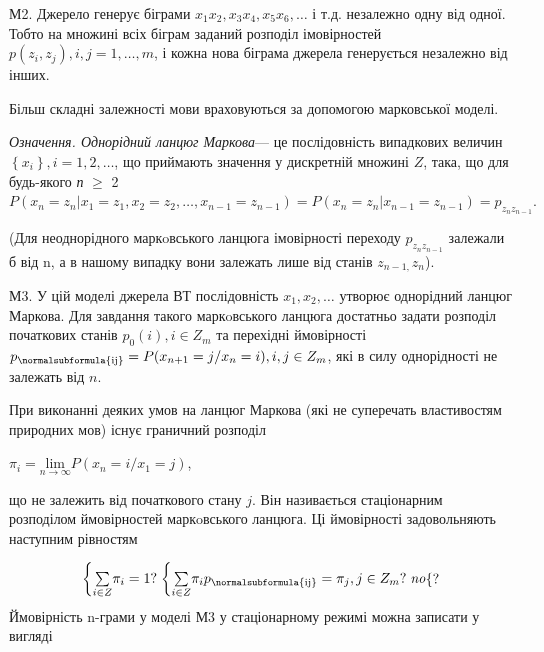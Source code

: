 М2. Джерело генерує біграми 
${x_{{1}}x_{{2}},x_{{3}}x_{{4}},x_{{5}}x_{{6}},\dots}$ і
т.д. незалежно одну від одної. Тобто на множині всіх біграм заданий розподіл
імовірностей  ${p(z_{{i}},z_{{j}}),i,j=1,\dots,m}$, і кожна
нова біграма джерела генерується незалежно від інших.

Більш складні залежності мови враховуються за допомогою марковської моделі.

\textit{Означення}\textit{. Однорідний ланцюг Маркова}--- це послідовність
випадкових величин  
${\left\{x_{{i}}\right.\left.\right\},i=1,2,\dots}$, що 
приймають значення у дискретній множині  ${Z}$, така, що для будь-якого 
\textit{п }${\geq}$ 2 
${P\left(x_{{n}}=z_{{n}}|x_{{1}}=z_{{1}},x_{{2}}=z_{{2}},\dots,x_{{n-1}}=z_{{n-1}}\right)=P\left(x_{{n}}=z_{{n}}|x_{{n-1}}=z_{{n-1}}\right)=p_{{z_{{n}}z_{{n-1}}}}\text{.}}$

 (Для неоднорідного маркoвського ланцюга імовірності переходу 
${p_{{z_{{n}}z_{{n-1}}}}}$ залежали б від n, а в нашому випадку вони залежать
лише від станів  ${z_{{n-1,}}z_{{n}}}$).

М3. У цій моделі джерела ВТ послідовність 
${x_{{1}},x_{{2}},\dots}$  утворює однорідний ланцюг
Маркова. Для завдання такого маркoвського ланцюга достатньо задати розподіл
початкових станів  ${p_{{0}}(i),i\in Z_{{m}}}$ та перехідні ймовірності 
${p_{{\normalsubformula{\text{ij}}}}=P(x_{{n+1}}=j/x_{{n}}=i),i,j\in Z_{{m}}}$,
які в силу однорідності не залежать від  ${n}$.

 При виконанні деяких умов на ланцюг Маркова (які не суперечать  властивостям
природних мов) існує граничний розподіл

{\centering
 ${\pi _{{i}}=\underset{{n\rightarrow \infty
}}{{\text{lim}}}P\left(x_{{n}}=i/x_{{1}}=j\right)}$,
\par}

що не залежить від початкового стану  ${j}$. Він називається стаціонарним
розподілом ймовірностей маркoвського ланцюга. Ці ймовірності задовольняють
наступним рівностям

\begin{equation*}
{\begin{matrix}\left\{\underset{{i\in Z}}{\sum }{\pi
_{{i}}}=1?\right.\left\{\underset{{i\in Z}}{\sum }{\pi
_{{i}}p_{{\normalsubformula{\text{ij}}}}}=\pi _{{j}},j\in
Z_{{m}}?\right.\mathit{no}\hfill\null \end{matrix}\{?}
\end{equation*}
Ймовірність n-грами у моделі М3 у стаціонарному режимі можна записати у вигляді


